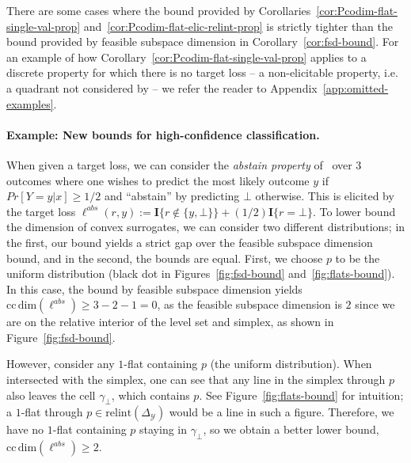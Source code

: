 \documentclass[anon,12pt]{colt2021} %
\newcommand{\Comments}{1}
\newcommand{\mytodo}[2]{\ifnum\Comments=1%
	\todo[linecolor=#1!80!black,backgroundcolor=#1,bordercolor=#1!80!black]{#2}\fi}
\newcommand{\raft}[1]{\mytodo{green!20!white}{RF: #1}}
\newcommand{\jessiet}[1]{\mytodo{purple!20!white}{JF: #1}}
\newcommand{\simplex}{\Delta_\Y}
\newcommand{\relint}[1]{\mathrm{relint}(#1)}
\newcommand{\ccdim}{\mathrm{cc\,dim}}
\newcommand{\Y}{\mathcal{Y}}
\newcommand{\Ind}[1]{\mathbf{I}\{{#1}\}}
\begin{document}
There are some cases where the bound provided by Corollaries~\ref{cor:Pcodim-flat-single-val-prop} and~\ref{cor:Pcodim-flat-elic-relint-prop} is strictly tighter than the bound provided by feasible subspace dimension in Corollary~\ref{cor:fsd-bound}.
For an example of how Corollary~\ref{cor:Pcodim-flat-single-val-prop} applies to a discrete property for which there is no target loss -- a non-elicitable property, i.e. a quadrant not considered by \citet{ramaswamy2018consistent} -- we refer the reader to Appendix~\ref{app:omitted-examples}.

\paragraph{Example: New bounds for high-confidence classification.}\label{subsec:examples-finite}
When given a target loss, we can consider the \emph{abstain property} of~\citet{ramaswamy2018consistent} over 3 outcomes where one wishes to predict the most likely outcome $y$ if $Pr[Y=y|x] \geq 1/2$ and ``abstain'' by predicting $\bot$ otherwise.
This is elicited by the target loss $\ell^{abs}(r,y) := \Ind{r \not \in \{y, \bot\}} + (1/2)\Ind{r = \bot}$. 
To lower bound the dimension of convex surrogates, we can consider two different distributions; in the first, our bound yields a strict gap over the feasible subspace dimension bound, and in the second, the bounds are equal.
First, we choose $p$ to be the uniform distribution (black dot in Figures~\ref{fig:fsd-bound} and~\ref{fig:flats-bound}).
In this case, the bound by feasible subspace dimension yields $\ccdim(\ell^{abs}) \geq 3 - 2 - 1 = 0$, as the feasible subspace dimension is $2$ since we are on the relative interior of the level set and simplex, as shown in Figure~\ref{fig:fsd-bound}.

However, consider any $1$-flat containing $p$ (the uniform distribution).
When intersected with the simplex, one can see that any line in the simplex through $p$ also leaves the cell $\gamma_\bot$, which contains $p$.
See Figure~\ref{fig:flats-bound} for intuition; a $1$-flat through $p \in \relint{\simplex}$ would be a line in such a figure.
Therefore, we have no $1$-flat containing $p$ staying in $\gamma_\bot$, so we obtain a better lower bound, $\ccdim(\ell^{abs}) \geq 2$.
\end{document}
